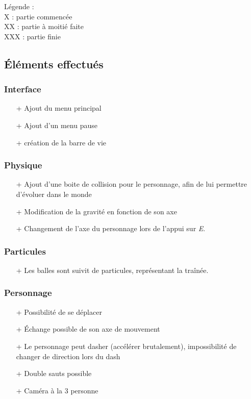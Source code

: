 ﻿\documentclass{article}
\begin{document}
Légende :\\
X : partie commencée\\
XX : partie à moitié faite\\
XXX : partie finie

\subsection{Éléments effectués}
\subsubsection{Interface}
\begin{itemize}
\item[+] Ajout du menu principal
\item[+] Ajout d'un menu pause
\item[+] création de la barre de vie
\end{itemize}

\subsubsection{Physique}
\begin{itemize}
\item[+] Ajout d'une boite de collision pour le personnage, afin de lui permettre d'évoluer dans le monde
\item[+] Modification de la gravité en fonction de son axe
\item[+] Changement de l'axe du personnage lors de l'appui sur \emph{E}.
\end{itemize}

\subsubsection{Particules}
\begin{itemize}
\item[+] Les balles sont suivit de particules, représentant la traînée.
\end{itemize}

\subsubsection{Personnage}
\begin{itemize}
\item[+] Possibilité de se déplacer
\item[+] Échange possible de son axe de mouvement
\item[+] Le personnage peut dasher (accélérer brutalement), impossibilité de changer de direction lors du dash
\item[+] Double sauts possible
\item[+] Caméra à la 3\ieme{} personne
\end{itemize}
\end{document}
